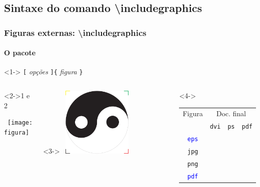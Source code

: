 \documentclass[handout,10pt]{beamer}
\begin{document}
\subsection{Sintaxe do comando {\ttfamily\textbackslash includegraphics}}
\begin{frame}[fragile]
	\frametitle{Figuras externas: {\ttfamily\textbackslash includegraphics}}
	\framesubtitle{O pacote }
	
	\begin{block}<1->{}
		\centering
		\verb|[|%
			\textit{opções}%
		\verb|]{|%
			\textit{figura}%
		\verb|}|
	\end{block}
	
	\begin{columns}
		\begin{atividade}<2->{1 e 2}
			\begin{LaTeXcode}
				\noindent\hrulefill\
				\texttt{[image: figura]}
				\hrulefill
			\end{LaTeXcode}
		\end{atividade}
		
		\medskip
		
		\begin{uncoverenv}<3->
			\hrulefill\
			\includegraphics[width=0.5\textwidth]{Tei-Gi}\
			\hrulefill
		\end{uncoverenv}
		
		\column[c]{0.4\textwidth}		
		\begin{uncoverenv}<4->
			\begin{tabular}{cccc}
				\toprule
				Figura & \multicolumn{3}{c}{Doc. final} \\
				\cmidrule{2-4}
				& \texttt{dvi} & \texttt{ps} & \texttt{pdf} \\
				\midrule
				\texttt{\textcolor{blue}{eps}} & \checkmark & \checkmark \\
				\texttt{jpg} & & & \checkmark \\
				\texttt{png} & & & \checkmark \\
				\texttt{\textcolor{blue}{pdf}} & & & \checkmark \\
				\bottomrule
			\end{tabular}	
		\end{uncoverenv}
		

\end{columns}
\end{frame}
\end{document}
